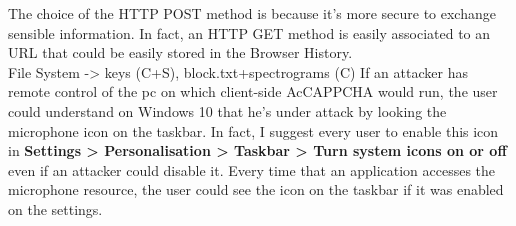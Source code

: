 The choice of the HTTP POST method is because it's more secure to exchange sensible information. In fact, an HTTP GET method is easily associated to an URL that could be easily stored in the Browser History.\\
File System -> keys (C+S), block.txt+spectrograms (C)
If an attacker has remote control of the pc on which client-side AcCAPPCHA would run, the user could understand on Windows 10 that he's under attack by looking the microphone icon on the taskbar. In fact, I suggest every user to enable this icon in \textbf{Settings > Personalisation > Taskbar > Turn system icons on or off} even if an attacker could disable it. Every time that an application accesses the microphone resource, the user could see the icon on the taskbar if it was enabled on the settings.   